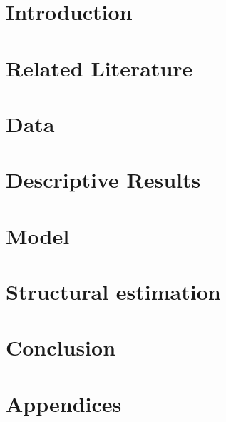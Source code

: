 \documentclass[a4paper,12pt,oneside,article]{memoir}
\begin{document}
\frontmatter
\begin{KeepFromToc}
\end{KeepFromToc}
\mainmatter
	\chapter{Introduction}\label{sec:intro}
	
	 \chapter{Related Literature}\label{sec:lit}
	 
	 \chapter{Data}\label{sec:data}
	 
	 \chapter{Descriptive Results}\label{sec:descriptives}
	 
	 \chapter{Model}\label{sec:model}
	 
	  \chapter{Structural estimation}\label{sec:estimation}
	 
	 \chapter{Conclusion}\label{sec:conclusion}
	
	 \chapter{Appendices}
	 
	\backmatter
	
	
\end{document}
